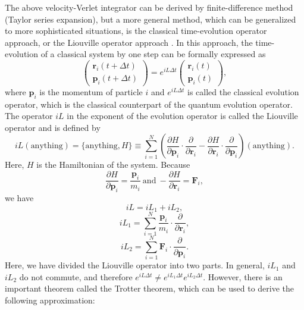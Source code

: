 \documentclass[12pt,a4paper]{report}
\newcommand{\vect}[1]{\boldsymbol{#1}}
\begin{document}
The above velocity-Verlet integrator can be derived by finite-difference method (Taylor series expansion), but a more general method, which can be generalized to more sophisticated situations, is the classical time-evolution operator approach, or the Liouville operator approach \cite{tuckerman2010}. In this approach, the time-evolution of a classical system by one step can be formally expressed as
\begin{equation}
\left(
\begin{array}{c}
\vect{r}_i(t+\Delta t) \\
\vect{p}_i(t+\Delta t)
\end{array}
\right) =
e^{iL\Delta t}
\left(
\begin{array}{c}
\vect{r}_i(t) \\
\vect{p}_i(t)
\end{array}
\right),
\end{equation}
where $\vect{p}_i$ is the momentum of particle $i$ and
$e^{iL\Delta t}$ is called the classical evolution operator, which is the classical counterpart of the quantum evolution operator. The operator $iL$ in the exponent of the evolution operator is called the Liouville operator and is defined by
\begin{equation}
iL (\text{anything}) = \{\text{anything}, H\} \equiv
\sum_{i=1}^N
\left(
\frac{\partial H}{\partial \vect{p}_i} \cdot
\frac{\partial  }{\partial \vect{r}_i}  -
\frac{\partial H}{\partial \vect{r}_i} \cdot
\frac{\partial  }{\partial \vect{p}_i}
\right) (\text{anything}).
\end{equation}
Here, $H$ is the Hamiltonian of the system. Because
\begin{equation}
\frac{\partial H}{\partial \vect{p}_i} =
\frac{\vect{p}_i}{m_i} ~ \text{and} ~
-\frac{\partial H}{\partial \vect{r}_i} =
\vect{F}_i,
\end{equation}
we have
\begin{equation}
iL = iL_1 + iL_2,
\end{equation}
\begin{equation}
iL_1 = \sum_{i=1}^N
\frac{\vect{p}_i}{m_i} \cdot
\frac{\partial }{\partial \vect{r}_i},
\end{equation}
\begin{equation}
iL_2 = \sum_{i=1}^N
\vect{F}_i \cdot
\frac{\partial }{\partial \vect{p}_i}.
\end{equation}
Here, we have divided the Liouville operator into two parts. In general, $iL_1$ and $iL_2$ do not commute, and therefore
$e^{iL \Delta t} \neq e^{iL_1 \Delta t}e^{iL_2 \Delta t}$. However, there is an important theorem called the Trotter theorem, which can be used to derive the following approximation:
\end{document}
